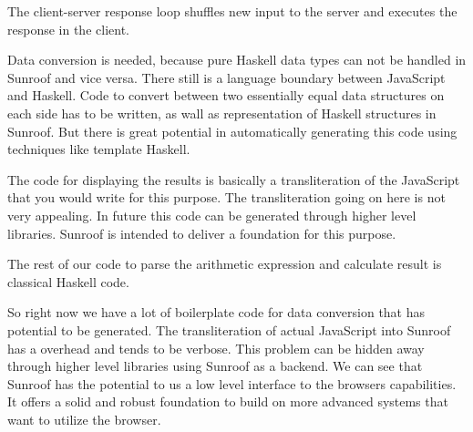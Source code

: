 The client-server response loop shuffles new input to the server 
and executes the response in the client.

Data conversion is needed, because pure Haskell data types
can not be handled in Sunroof and vice versa. There still
is a language boundary between JavaScript and Haskell. 
Code to convert between two essentially equal data structures on 
each side has to be written, as wall as representation of Haskell 
structures in Sunroof. But there is great potential in automatically 
generating this code using techniques like template Haskell.

The code for displaying the results is basically a 
transliteration of the JavaScript that you would write for this 
purpose.
The transliteration going on here is not very appealing. 
In future this code can be generated through higher level 
libraries. Sunroof is intended to deliver a foundation for
this purpose.

The rest of our code to parse the arithmetic expression and calculate 
result is classical Haskell code. 

So right now we have a lot of boilerplate code for data conversion
that has potential to be generated.
The transliteration of actual JavaScript into Sunroof has a overhead and
tends to be verbose. This problem can be hidden away through 
higher level libraries using Sunroof as a backend. 
We can see that Sunroof has the potential to us a low level interface
to the browsers capabilities. It offers a solid and robust foundation to build
on more advanced systems that want to utilize the browser.

